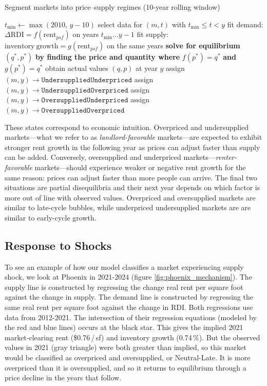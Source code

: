 \documentclass[APA,Times1COL]{WileyNJDv5} %
\begin{document}
 
\FloatBarrier
\begin{algorithm}
	\caption{\enskip Segment markets into price–supply regimes (10‑year rolling window)}%
	\label{alg:market_segmentation}
	\begin{algorithmic}[1]
		\State $t_{\min}\gets \max(2010,\,y-10)$
		\State select data for $(m,t)$ with $t_{\min}\le t < y$
		\State fit demand: $\Delta\mathrm{RDI} = f(\mathrm{rent}_{psf})$ on years $t_{\min}\ldots y-1$
		\State fit supply: $\mathrm{inventory\ growth} = g(\mathrm{rent}_{psf})$ on the same years
		\State \textbf{solve for equilibrium} $(q^*,p^*)$ \textbf{by finding the price and quantity where}
		$f(p^*) = q^*$ \textbf{and} $g(p^*) = q^*$
		\State obtain actual values $(q,p)$ at year $y$
		\State assign $(m,y)\to\texttt{UndersuppliedUnderpriced}$
		\Else
		\State assign $(m,y)\to\texttt{UndersuppliedOverpriced}$
		\EndIf
		\Else
		\State assign $(m,y)\to\texttt{OversuppliedUnderpriced}$
		\Else
		\State assign $(m,y)\to\texttt{OversuppliedOverpriced}$
		\EndIf
		\EndIf
		\EndFor
		\EndFor
	\end{algorithmic}
\end{algorithm}
\FloatBarrier
These states correspond to economic intuition. Overpriced and undersupplied markets---what we refer to as \textit{landlord-favorable} markets---are expected to exhibit stronger rent growth in the following year as prices can adjust faster than supply can be added. Conversely, oversupplied and underpriced markets---\textit{renter-favorable} markets---should experience weaker or negative rent growth for the same reason: prices can adjust faster than more people can arrive. The final two situations are partial disequilibria and their next year depends on which factor is more out of line with observed values. Overpriced and oversupplied markets are similar to late-cycle bubbles, while underpriced undersupplied markets are are similar to early-cycle growth. 


\subsection{Response to Shocks}
To see an example of how our model classifies a market experiencing supply shock, we look at Phoenix in 2021-2024 (figure \ref{fig:phoenix_mechanism}). The supply line is constructed by regressing the change real rent per square foot against the change in supply. The demand line is constructed by regressing the same real rent per square foot against the change in RDI. Both regressions use data from 2012-2021. The intersection of their regression equations (modeled by the red and blue lines) occurs at the black star. This gives the implied 2021 market‑clearing rent (\$0.76 / sf) and inventory growth (0.74 \%). But the observed values in 2021 (gray triangle) were both greater than implied, so this market would be classified as overpriced and oversupplied, or Neutral-Late. It is more overpriced than it is oversupplied, and so it returns to equilibrium through a price decline in the years that follow. 
\end{document}
